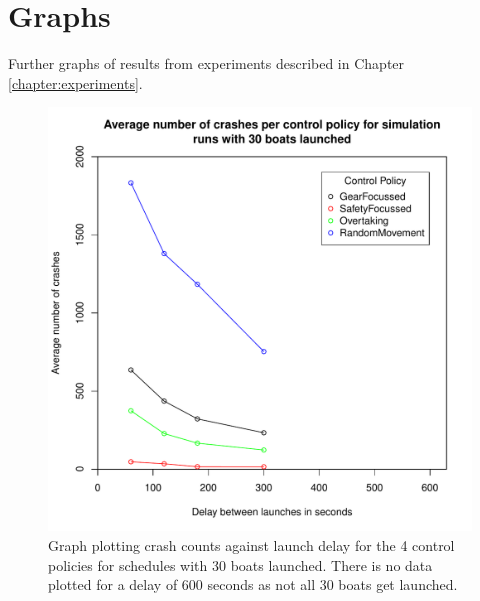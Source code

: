 \chapter{Graphs} \label{appendix:graphs}
Further graphs of results from experiments described in Chapter \ref{chapter:experiments}.

\begin{figure}[hb]
\begin{center}
  \includegraphics[scale=0.8]{"images/graphs/Average number of crashes per control policy for simulation runs with 30 boats launched"}
  \caption{Graph plotting crash counts against launch delay for the 4 control policies for schedules with 30 boats launched. There is no data plotted for a delay of 600 seconds as not all 30 boats get launched.}
  \label{appendix:graphs:crash_counts_30_launches}
\end{center}
\end{figure}

